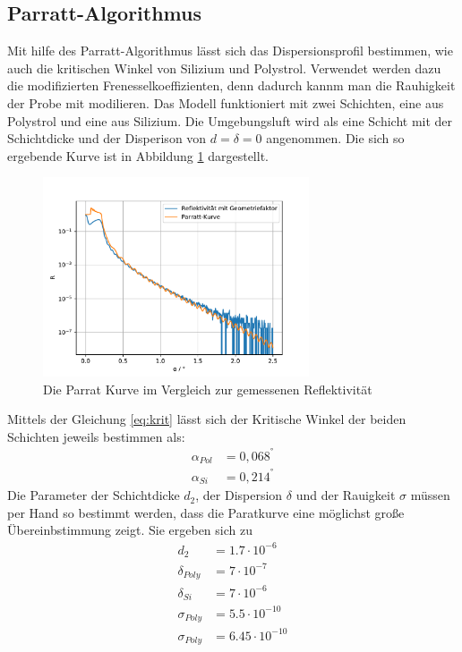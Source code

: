 \subsection{Parratt-Algorithmus}

Mit hilfe des Parratt-Algorithmus lässt sich das Dispersionsprofil bestimmen,
wie auch die kritischen Winkel von Silizium und Polystrol.
Verwendet werden dazu die modifizierten Frenesselkoeffizienten,
denn dadurch kannm man die Rauhigkeit der Probe mit modilieren.
Das Modell funktioniert mit zwei Schichten, eine aus Polystrol und eine aus Silizium.
Die Umgebungsluft wird als eine Schicht mit der Schichtdicke und der Disperison von $d = \delta = 0$ angenommen.
Die sich so ergebende Kurve ist in Abbildung \ref{fig:parratt} dargestellt.
\begin{figure}[h]
    \centering
    \includegraphics[width = 0.7\textwidth]{Auswertung/Graphen/Parrat_Algorthmus.pdf}
    \caption{Die Parrat Kurve im Vergleich zur gemessenen Reflektivität}
    \label{fig:parratt}
\end{figure}
Mittels der Gleichung \eqref{eq:krit} lässt sich der Kritische Winkel der beiden Schichten jeweils bestimmen als:
\begin{align}
    \alpha_{Pol} &= 0,068^° \\
    \alpha_{Si}  &= 0,214^°
\end{align}
Die Parameter der Schichtdicke $d_2$, der Dispersion $\delta$ und der Rauigkeit $\sigma$ müssen per Hand so bestimmt werden,
dass die Paratkurve eine möglichst große Übereinbstimmung zeigt.
Sie ergeben sich zu
\begin{align*} 
    d_2 &=  1.7\cdot 10^{-6} \\
    \delta_{Poly} &= 7\cdot 10^{-7} \\
    \delta_{Si} &= 7\cdot 10^{-6} \\
    \sigma_{Poly} &=  5.5\cdot 10^{-10}\\
    \sigma_{Poly} &=  6.45\cdot 10^{-10}
\end{align*}
